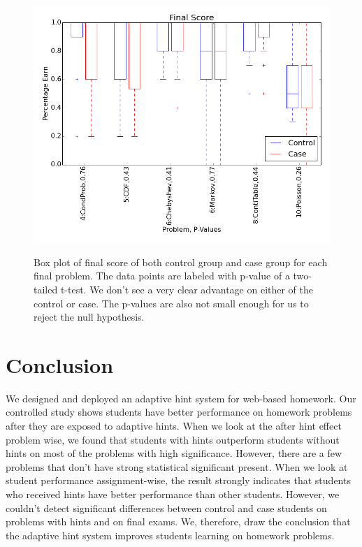 \documentclass{llncs2e/llncs}
\begin{document}
\begin{figure}[h]
\centering
\caption{Box plot of final score of both control group and case group for each final problem. The data points are labeled with p-value of a two-tailed t-test. We don't see a very clear advantage on either of the control or case. The p-values are also not small enough for us to reject the null hypothesis.}
\includegraphics[width=0.9\linewidth]{image/final_boxPlot.png}
\label{fig:final_compare_all}
\end{figure}



\section{Conclusion}

We designed and deployed an adaptive hint system for web-based homework. Our controlled study shows students have better performance on homework problems after they are exposed to adaptive hints. When we look at the after hint effect problem wise, we found that students with hints outperform students without hints on most of the problems with high significance. However, there are a few problems that don't have strong statistical significant present. When we look at student performance assignment-wise, the result strongly indicates that students who received hints have better performance than other students. However, we couldn't detect significant differences between control and case students on problems with hints and on final exams. We, therefore, draw the conclusion that the adaptive hint system improves students learning on homework problems.\\





\end{document}

